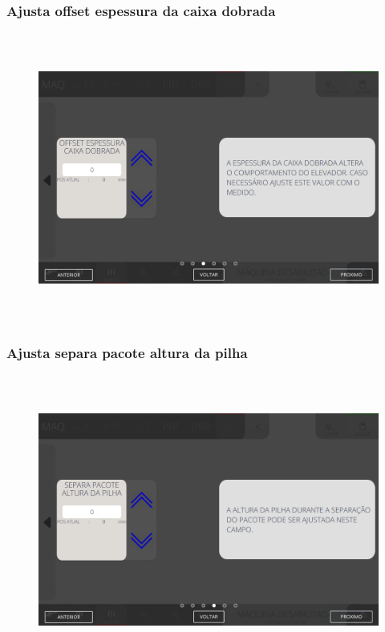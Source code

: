 \newpage
\thispagestyle{fancy}
\vspace*{\fill}
\subsubsection{\small{Ajusta offset espessura da caixa dobrada}}
\begin{figure}[h]
  \centering
  \includegraphics[width=576px,height=360px]{src/imagesFlexo/08-count/settings/e-9.png}
\end{figure}
\vspace*{\fill}


\newpage
\thispagestyle{fancy}
\vspace*{\fill}
\subsubsection{\small{Ajusta separa pacote altura da pilha}}
\begin{figure}[h]
  \centering
  \includegraphics[width=576px,height=360px]{src/imagesFlexo/08-count/settings/e-10.png}
\end{figure}
\vspace*{\fill}


